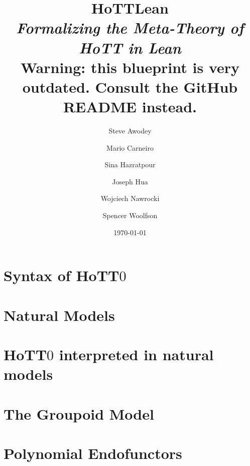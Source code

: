 
\title{HoTTLean\\
 { \it Formalizing the Meta-Theory of HoTT in Lean}\\
 { \textbf Warning: this blueprint is very outdated. Consult the GitHub README instead. } }
\author{Steve Awodey \and Mario Carneiro \and Sina Hazratpour \and Joseph Hua \and
  Wojciech Nawrocki \and Spencer Woolfson}
\date{\today}


\maketitle

\chapter{Syntax of HoTT$0$}

\chapter{Natural Models}

\chapter{HoTT$0$ interpreted in natural models}

\chapter{The Groupoid Model}

\chapter{Polynomial Endofunctors}


{}



